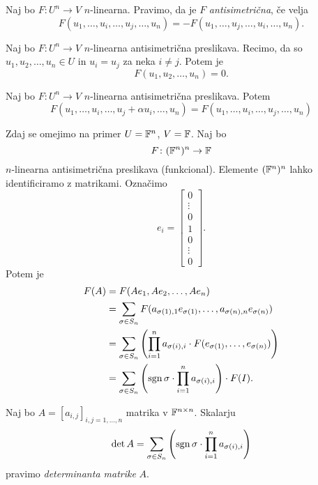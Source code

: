 \documentclass[12pt, a4paper]{article}
\begin{document}
\begin{definicija}
Naj bo $F\colon U^n\to V$ $n$-linearna. Pravimo, da je $F$ \emph{antisimetrična}, če velja
\[
F(u_1,\dots,u_i,\dots,u_j,\dots,u_n)=-F(u_1,\dots,u_j,\dots,u_i,\dots,u_n).
\]
\end{definicija}

\begin{trditev}
Naj bo $F\colon U^n\to V$ $n$-linearna antisimetrična preslikava. Recimo, da so $u_1,u_2,\dots,u_n\in U$ in $u_i=u_j$ za neka $i\ne j$. Potem je
\[
F(u_1,u_2,\dots,u_n)=0.
\]
\end{trditev}

\obvs

\begin{trditev}
Naj bo $F\colon U^n\to V$ $n$-linearna antisimetrična preslikava. Potem
\[
F(u_1,\dots,u_i,\dots,u_j+\alpha u_i,\dots,u_n)=F(u_1,\dots,u_i,\dots,u_j,\dots,u_n)
\]
\end{trditev}

\obvs

Zdaj se omejimo na primer $U=\mathbb{F}^n$, $V=\mathbb{F}$. Naj bo
\[
F\colon (\mathbb{F}^n)^n\to\mathbb{F}
\]
$n$-linearna antisimetrična preslikava (funkcional). Elemente $(\mathbb{F}^n)^n$ lahko identificiramo z matrikami. Označimo
\[
e_i=\begin{bmatrix}
0      \\ 
\vdots \\ 
0      \\ 
1      \\ 
0      \\ 
\vdots \\ 
0
\end{bmatrix}.
\]
Potem je
\begin{align*}
F(A)&=F(Ae_1,Ae_2,\dots,Ae_n)
\\
&=\sum_{\sigma\in S_n} F(a_{\sigma(1),1}e_{\sigma(1)},\dots,a_{\sigma(n),n}e_{\sigma(n)})
\\
&=\sum_{\sigma\in S_n} \left(\prod_{i=1}^n a_{\sigma(i),i}\cdot F(e_{\sigma(1)},\dots,e_{\sigma(n)})\right)
\\
&=\sum_{\sigma\in S_n} \left(\operatorname{sgn}\sigma\cdot\prod_{i=1}^n a_{\sigma(i),i}\right)\cdot F(I).
\end{align*}

\begin{okvir}
\begin{definicija}
Naj bo $A=[a_{i,j}]_{i,j=1,\dots,n}$ matrika v $\mathbb{F}^{n\times n}$. Skalarju
\[
\det A=\sum_{\sigma\in S_n} \left(\operatorname{sgn}\sigma\cdot\prod_{i=1}^n a_{\sigma(i),i}\right)
\]
pravimo \emph{determinanta matrike} $A$.
\end{definicija}
\end{okvir}
\end{document}
